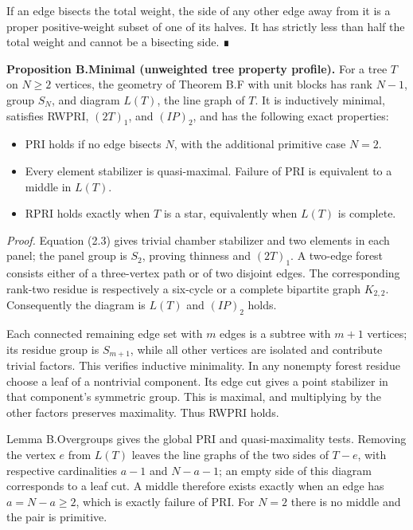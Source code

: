 \documentclass[
  11pt,
  a4paper,
]{article}
\providecommand{\tightlist}{%
  \setlength{\itemsep}{0pt}\setlength{\parskip}{0pt}}
\begin{document}
If an edge bisects the total weight, the side of any other edge away
from it is a proper positive-weight subset of one of its halves. It has
strictly less than half the total weight and cannot be a bisecting side.
∎

\textbf{Proposition B.Minimal (unweighted tree property profile).} For a
tree \(T\) on \(N\geq2\) vertices, the geometry of Theorem B.F with unit
blocks has rank \(N-1\), group \(S_N\), and diagram \(L(T)\), the line
graph of \(T\). It is inductively minimal, satisfies RWPRI, \((2T)_1\),
and \((IP)_2\), and has the following exact properties:

\begin{itemize}
\tightlist
\item
  PRI holds if no edge bisects \(N\), with the additional primitive case
  \(N=2\).
\item
  Every element stabilizer is quasi-maximal. Failure of PRI is
  equivalent to a middle in \(L(T)\).
\item
  RPRI holds exactly when \(T\) is a star, equivalently when \(L(T)\) is
  complete.
\end{itemize}

\emph{Proof.} Equation (2.3) gives trivial chamber stabilizer and two
elements in each panel; the panel group is \(S_2\), proving thinness and
\((2T)_1\). A two-edge forest consists either of a three-vertex path or
of two disjoint edges. The corresponding rank-two residue is
respectively a six-cycle or a complete bipartite graph \(K_{2,2}\).
Consequently the diagram is \(L(T)\) and \((IP)_2\) holds.

Each connected remaining edge set with \(m\) edges is a subtree with
\(m+1\) vertices; its residue group is \(S_{m+1}\), while all other
vertices are isolated and contribute trivial factors. This verifies
inductive minimality. In any nonempty forest residue choose a leaf of a
nontrivial component. Its edge cut gives a point stabilizer in that
component's symmetric group. This is maximal, and multiplying by the
other factors preserves maximality. Thus RWPRI holds.

Lemma B.Overgroups gives the global PRI and quasi-maximality tests.
Removing the vertex \(e\) from \(L(T)\) leaves the line graphs of the
two sides of \(T-e\), with respective cardinalities \(a-1\) and
\(N-a-1\); an empty side of this diagram corresponds to a leaf cut. A
middle therefore exists exactly when an edge has \(a=N-a\geq2\), which
is exactly failure of PRI. For \(N=2\) there is no middle and the pair
is primitive.
\end{document}
